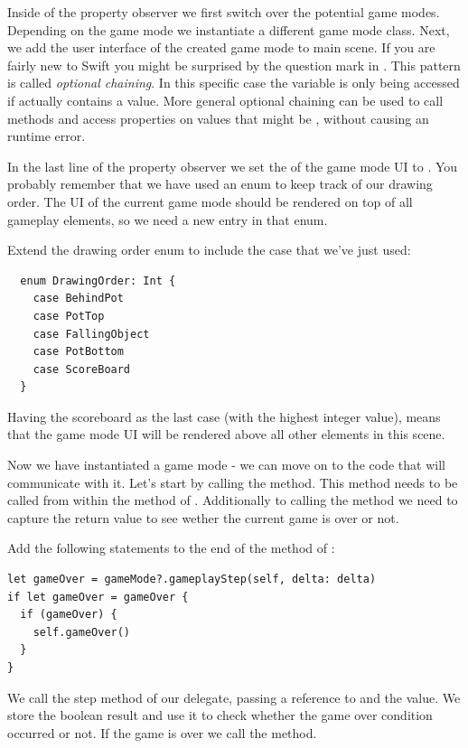 Inside of the property observer we first switch over the potential game modes.
Depending on the game mode we instantiate a different game mode class. Next, we
add the user interface of the created game mode to main scene. If you are fairly
new to Swift you might be surprised by the question mark in
. This pattern is called
\textit{optional chaining}. In this specific case the 
variable is only being accessed if  actually
contains a value. More general optional chaining can be used to call methods and
access properties on values that might be , without causing an
runtime error.

In the last line of the property observer we set the  of the
game mode UI to . You probably
remember that we have used an enum to keep track of our drawing order. The UI of
the current game mode should be rendered on top of all gameplay elements, so we
need a new entry in that enum.

\begin{leftbar}
Extend the drawing order enum to include the case
 that we've just used:
\begin{lstlisting}
  enum DrawingOrder: Int {
    case BehindPot
    case PotTop
    case FallingObject
    case PotBottom
    case ScoreBoard
  }
\end{lstlisting}
\end{leftbar}
Having the scoreboard as the last case (with the highest integer value),
means that the game mode UI will be rendered above all other elements in this
scene.

Now we have instantiated a game mode - we can move on to the code that will
communicate with it. Let's start by calling the
 method. This method needs to be
called from within the  method of .
Additionally to calling the method we need to capture the return value to see
wether the current game is over or not.

\begin{leftbar}
Add the following statements to the end of the  method of
:
\begin{lstlisting}
let gameOver = gameMode?.gameplayStep(self, delta: delta)
if let gameOver = gameOver {
  if (gameOver) {
    self.gameOver()
  }
}
\end{lstlisting}
\end{leftbar}
We call the step method of our delegate, passing a reference to
 and the  value. We store the boolean result
and use it to check whether the game over condition occurred or not. If the game
is over we call the  method.

